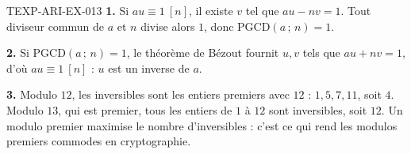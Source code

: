 \begin{corrige}{TEXP-ARI-EX-013}
\textbf{1.} Si $au\equiv1\ [n]$, il existe $v$ tel que $au-nv=1$. Tout
diviseur commun de $a$ et $n$ divise alors $1$, donc
$\mathrm{PGCD}(a\,;\,n)=1$.

\textbf{2.} Si $\mathrm{PGCD}(a\,;\,n)=1$, le théorème de Bézout fournit $u,v$
tels que $au+nv=1$, d'où $au\equiv1\ [n]$ : $u$ est un inverse de $a$.

\textbf{3.} Modulo $12$, les inversibles sont les entiers premiers avec $12$ :
$1,5,7,11$, soit $4$. Modulo $13$, qui est premier, tous les entiers de $1$ à
$12$ sont inversibles, soit $12$. Un modulo premier maximise le nombre
d'inversibles : c'est ce qui rend les modulos premiers commodes en
cryptographie.
\end{corrige}
